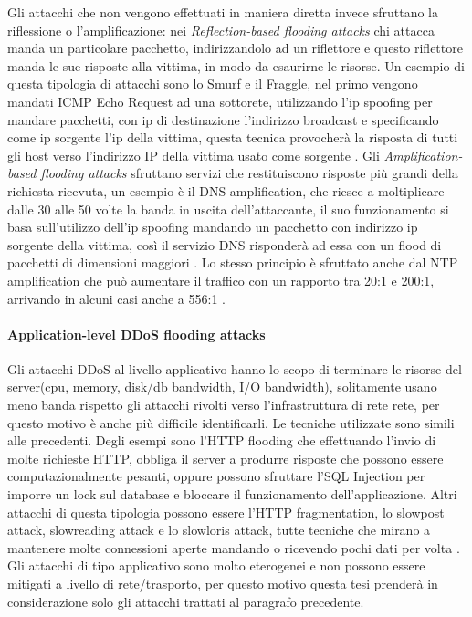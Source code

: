 Gli attacchi che non vengono effettuati in maniera diretta invece sfruttano la riflessione o l'amplificazione: nei \emph{Reflection-based flooding attacks} chi attacca manda un particolare pacchetto, indirizzandolo ad un riflettore e questo riflettore manda le sue risposte alla vittima, in modo da esaurirne le risorse. Un esempio di questa tipologia di attacchi sono lo Smurf e il Fraggle, nel primo vengono mandati ICMP Echo Request ad una sottorete, utilizzando l'ip spoofing per mandare pacchetti, con ip di destinazione l'indirizzo broadcast e specificando come ip sorgente l'ip della vittima, questa tecnica provocherà la risposta di tutti gli host verso l'indirizzo IP della vittima usato come sorgente \cite{ddos_survey_2}.
Gli \emph{Amplification-based flooding attacks} sfruttano servizi che restituiscono risposte più grandi della richiesta ricevuta, un esempio è il DNS amplification, che riesce a moltiplicare dalle 30 alle 50 volte \cite{imperva_amplification} la banda in uscita dell'attaccante, il suo funzionamento si basa sull'utilizzo dell'ip spoofing mandando un pacchetto con indirizzo ip sorgente della vittima, così il servizio DNS risponderà ad essa con un flood di pacchetti di dimensioni maggiori \cite{ddos_survey_1}. Lo stesso principio è sfruttato anche dal NTP amplification che può aumentare il traffico con un rapporto tra 20:1 e 200:1, arrivando in alcuni casi anche a 556:1 \cite{imperva_amplification}. 


\paragraph{Application-level DDoS flooding attacks} %
Gli attacchi DDoS al livello applicativo hanno lo scopo di terminare le risorse del server(cpu, memory, disk/db bandwidth, I/O bandwidth), solitamente usano meno banda rispetto gli attacchi rivolti verso l'infrastruttura di rete rete, per questo motivo è anche più difficile identificarli. Le tecniche utilizzate sono simili alle precedenti. Degli esempi sono l'HTTP flooding che effettuando l'invio di molte richieste HTTP, obbliga il server a produrre risposte che possono essere computazionalmente pesanti, oppure possono sfruttare l'SQL Injection per imporre un lock sul database e bloccare il funzionamento dell'applicazione. Altri attacchi di questa tipologia possono essere l'HTTP fragmentation, lo slowpost attack, slowreading attack e lo slowloris attack, tutte tecniche che mirano a mantenere molte connessioni aperte mandando o ricevendo pochi dati per volta \cite{ddos_survey_1}.
Gli attacchi di tipo applicativo sono molto eterogenei e non possono essere mitigati a livello di rete/trasporto, per questo motivo questa tesi prenderà in considerazione solo gli attacchi trattati al paragrafo precedente.

